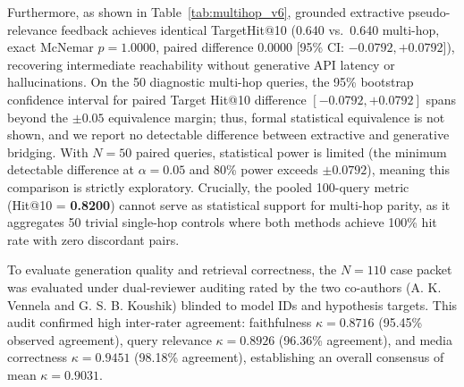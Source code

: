 \documentclass[conference]{IEEEtran}
\begin{document}
Furthermore, as shown in Table~\ref{tab:multihop_v6}, grounded extractive pseudo-relevance feedback achieves identical TargetHit@10 (0.640 vs.\ 0.640 multi-hop, exact McNemar $p = 1.0000$, paired difference $0.0000$ [95\% CI: $-0.0792, +0.0792$]), recovering intermediate reachability without generative API latency or hallucinations. On the 50 diagnostic multi-hop queries, the 95\% bootstrap confidence interval for paired Target Hit@10 difference $[-0.0792, +0.0792]$ spans beyond the $\pm 0.05$ equivalence margin; thus, formal statistical equivalence is not shown, and we report no detectable difference between extractive and generative bridging. With $N=50$ paired queries, statistical power is limited (the minimum detectable difference at $\alpha=0.05$ and 80\% power exceeds $\pm 0.0792$), meaning this comparison is strictly exploratory. Crucially, the pooled 100-query metric (Hit@10 = \textbf{0.8200}) cannot serve as statistical support for multi-hop parity, as it aggregates 50 trivial single-hop controls where both methods achieve 100\% hit rate with zero discordant pairs.

To evaluate generation quality and retrieval correctness, the $N=110$ case packet was evaluated under dual-reviewer auditing rated by the two co-authors (A. K. Vennela and G. S. B. Koushik) blinded to model IDs and hypothesis targets. This audit confirmed high inter-rater agreement: faithfulness $\kappa = 0.8716$ (95.45\% observed agreement), query relevance $\kappa = 0.8926$ (96.36\% agreement), and media correctness $\kappa = 0.9451$ (98.18\% agreement), establishing an overall consensus of mean $\kappa = 0.9031$.

\begin{table}[t]
\centering\small
\caption{Extractive PRF vs.\ Generative LLM Multi-Hop Bridging across Diagnostic Multi-Hop ($N=50$) and Expanded ($N=100$) Suites.}\label{tab:multihop_v6}
\end{table}
\end{document}
